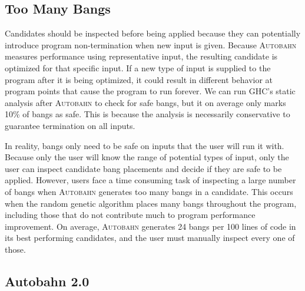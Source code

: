 \documentclass[format=sigplan, review=true]{acmart}
\begin{document}
\subsection{Too Many Bangs}

Candidates should be inspected before being applied because they can potentially introduce program non-termination when new input is given. Because \textsc{Autobahn} measures performance using representative input, the resulting candidate is optimized for that specific input. If a new type of input is supplied to the program after it is being optimized, it could result in different behavior at program points that cause the program to run forever. We can run GHC's static analysis after \textsc{Autobahn} to check for safe bangs, but it on average only marks 10\% of bangs as safe. This is because the analysis is necessarily conservative to guarantee termination on all inputs. 

In reality, bangs only need to be safe on inputs that the user will run it with. 
Because only the user will know the range of potential types of input, only the user can inspect candidate bang placements and decide if they are safe to be applied. However, users face a time consuming task of inspecting a large number of bangs when \textsc{Autobahn} generates too many bangs in a candidate. This occurs when the random genetic algorithm places many bangs throughout the program, including those that do not contribute much to program performance improvement. On average, \textsc{Autobahn} generates 24 bangs per 100 lines of code in its best performing candidates, and the user must manually inspect every one of those.   

\subsection{Autobahn 2.0}
\end{document}
